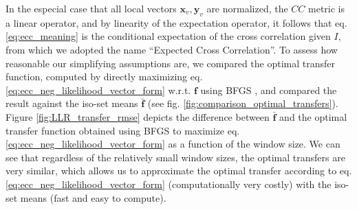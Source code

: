 In the especial case that all local vectors $\mathbf{x}_{v}, \mathbf{y}_{v}$ are normalized, the $CC$ metric is a linear operator, and by linearity of the expectation operator, it follows that eq. \eqref{eq:ecc_meaning} is the conditional expectation of the cross correlation given $I$, from which we adopted the name ``Expected Cross Correlation''. To assess how reasonable our simplifying assumptions are, we compared the optimal transfer function, computed by directly maximizing eq. \eqref{eq:ecc_neg_likelihood_vector_form} w.r.t. $\mathbf{f}$ using BFGS \citep{GVK502988711}, and compared the result against the iso-set means $\mathbf{\bar{f}}$ (see fig. \ref{fig:comparison_optimal_transfers}). Figure \ref{fig:LLR_transfer_rmse} depicts the difference between $\mathbf{\bar{f}}$ and the optimal transfer function obtained using BFGS to maximize eq. \eqref{eq:ecc_neg_likelihood_vector_form} as a function of the window size. We can see that regardless of the relatively small window sizes, the optimal transfers are very similar, which allows us to approximate the optimal transfer according to eq. \eqref{eq:ecc_neg_likelihood_vector_form} (computationally very costly) with the iso-set means (fast and easy to compute). \\

